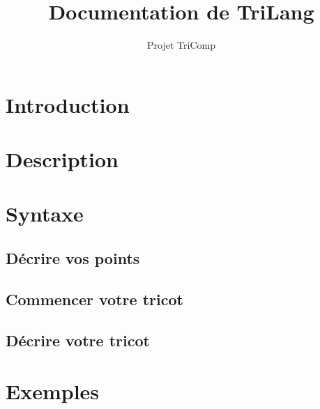 \documentclass[a4paper,10pt]{article}
\title{Documentation de TriLang}
\author{Projet TriComp}
\begin{document}
\maketitle

\begin{abstract}

\end{abstract}

\section{Introduction}

\section{Description}


\section{Syntaxe}

  \subsection{Décrire vos points}
  
  \subsection{Commencer votre tricot}
  
  \subsection{Décrire votre tricot}



\appendix

\section{Exemples}
\end{document}
